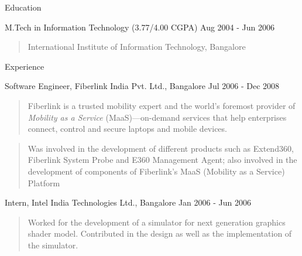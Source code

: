 \documentclass{resume}
\author{Ashish Tulsian}
\begin{document}
 \maketitle

\begin{category}{Education}{}

    \item {\topic M.Tech in Information Technology}
        {\footnotesize(3.77/4.00 CGPA)}
        {\period Aug 2004 - Jun 2006}
        \begin{quote}
            International Institute of Information Technology, Bangalore
        \end{quote}

\end{category}


\begin{category}{Experience}{}

    \item {\topic Software Engineer,} Fiberlink India Pvt. Ltd., Bangalore
        {\period Jul 2006 - Dec 2008}
        \begin{quote}
            Fiberlink is a trusted mobility expert and the world's foremost
            provider of {\em Mobility as a Service} (MaaS)---on-demand services that help
            enterprises connect, control and secure laptops and mobile devices.
        \end{quote}
        \begin{quote}
            Was involved in the development of different products such as
            Extend360, Fiberlink System Probe and E360 Management Agent; also
            involved in the development of components of Fiberlink's MaaS
            (Mobility as a Service) Platform
        \end{quote}

    \item {\topic Intern,} Intel India Technologies Ltd., Bangalore
        {\period Jan 2006 - Jun 2006}
        \begin{quote}
            Worked for the development of a simulator for next generation
            graphics shader model. Contributed in the design as well as the
        implementation of the simulator.
        \end{quote}

\end{category}
\end{document}
